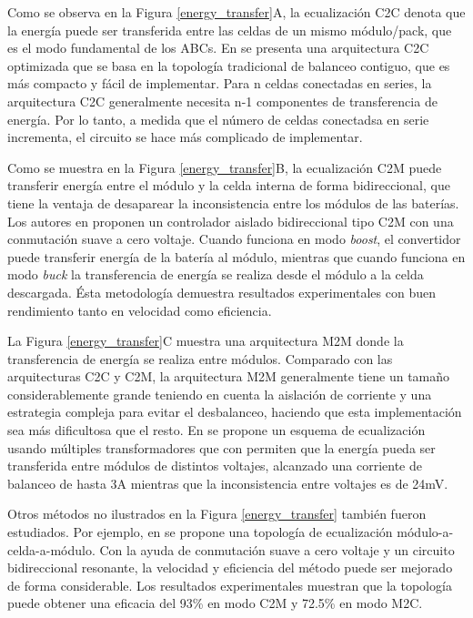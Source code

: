 \documentclass[10pt,a4paper]{article}
\begin{document}
Como se observa en la Figura \ref{energy_transfer}A, la ecualizaci\'on
\acrshort{C2C} denota que la energ\'ia puede ser transferida entre las celdas de
un mismo m\'odulo/pack, que es el modo fundamental de los \acrshort{ABC}s. En
\cite{phung_bal} se presenta una arquitectura \acrshort{C2C} optimizada que se 
basa en la topolog\'ia tradicional de balanceo contiguo, que es m\'as compacto y 
f\'acil de implementar. Para n celdas conectadas en series, la arquitectura 
\acrshort{C2C} generalmente necesita n-1 componentes de transferencia de 
energ\'ia. Por lo tanto, a medida que el n\'umero de celdas conectadsa en serie 
incrementa, el circuito se hace m\'as complicado de implementar.

Como se muestra en la Figura \ref{energy_transfer}B, la ecualizaci\'on
\acrshort{C2M} puede transferir energ\'ia entre el m\'odulo  y la celda interna
de forma bidireccional, que tiene la ventaja de desaparear la inconsistencia
entre los m\'odulos de las bater\'ias. Los autores en \cite{lu_et_al_bal} 
proponen un controlador aislado bidireccional tipo \acrshort{C2M} con una 
conmutaci\'on suave a cero voltaje. Cuando funciona en modo \emph{boost}, el 
convertidor puede transferir energ\'ia de la bater\'ia al m\'odulo, mientras que 
cuando funciona en modo \emph{buck} la transferencia de energ\'ia se realiza 
desde el m\'odulo a la celda descargada. \'Esta metodolog\'ia demuestra 
resultados experimentales con buen rendimiento tanto en velocidad como 
eficiencia.

La Figura \ref{energy_transfer}C muestra una arquitectura \acrshort{M2M}
donde la transferencia de energ\'ia se realiza entre m\'odulos. Comparado con
las arquitecturas \acrshort{C2C} y \acrshort{C2M}, la arquitectura 
\acrshort{M2M} generalmente tiene un tamaño considerablemente grande teniendo en 
cuenta la aislaci\'on de corriente y una estrategia compleja para evitar el 
desbalanceo, haciendo que esta implementaci\'on sea m\'as dificultosa que el 
resto. En \cite{ji_et_al_bal_mod} se propone un esquema de ecualizaci\'on usando 
m\'ultiples transformadores que con permiten que la energ\'ia pueda ser 
transferida entre m\'odulos de distintos voltajes, alcanzado una corriente de 
balanceo de hasta 3A mientras que la inconsistencia entre voltajes es de 24mV.

Otros m\'etodos no ilustrados en la Figura \ref{energy_transfer} tambi\'en
fueron estudiados. Por ejemplo, en \cite{li_et_al_bal} se propone una 
topolog\'ia de ecualizaci\'on m\'odulo-a-celda-a-m\'odulo. Con la ayuda de 
conmutaci\'on suave a cero voltaje y un circuito bidireccional resonante, la 
velocidad y eficiencia del m\'etodo puede ser mejorado de forma considerable. 
Los resultados experimentales muestran que la topolog\'ia puede obtener una 
eficacia del 93\% en modo \acrshort{C2M} y 72.5\% en modo \acrshort{M2C}.
\end{document}
